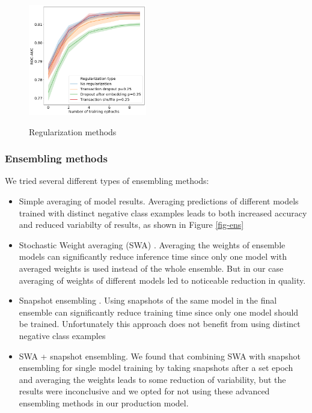 \documentclass[sigconf]{acmart}
\begin{document}
\begin{figure}[ht]
  \caption{Regularization methods}
  \includegraphics[width=0.46\textwidth]{figures/do-pic.png}
  \label{fig-reg}
\end{figure}


\subsubsection{Ensembling methods} \label{sec-ens}

We tried several different types of ensembling methods:
\begin{itemize}
\item Simple averaging of model results. Averaging predictions of different models trained with distinct negative class examples leads to both increased accuracy and reduced variabilty of results, as shown in Figure \ref{fig-ens}
\item Stochastic Weight averaging (SWA) \cite{DBLP:journals/corr/LoshchilovH16a}.  Averaging the weights of ensemble models can significantly reduce inference time since only one model with averaged weights is used instead of the whole ensemble. But in our case averaging of weights of different models led to noticeable reduction in quality.
\item Snapshot ensembling \cite{DBLP:journals/corr/HuangLPLHW17}. Using snapshots of the same model in the final ensemble can significantly reduce training time since only one model should be trained. Unfortunately this approach does not benefit from using distinct negative class examples 
\item SWA + snapshot ensembling. We found that combining SWA with snapshot ensembling for single model training by taking snapshots after a set epoch and averaging the weights leads to some reduction of variability, but the results were inconclusive and we opted for not using these advanced ensembling methods in our production model.
\end{itemize}
\end{document}
